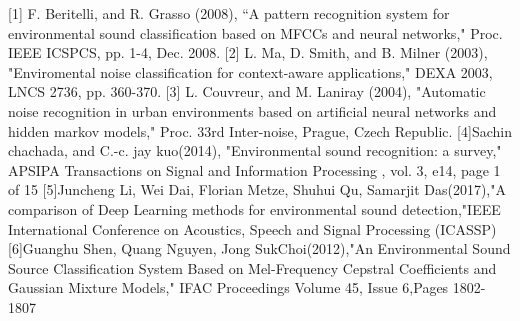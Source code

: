 [1] F. Beritelli, and R. Grasso (2008), “A pattern recognition system for environmental sound classification based on MFCCs and neural networks," Proc. IEEE ICSPCS, pp.
1-4, Dec. 2008.
[2] L. Ma, D. Smith, and B. Milner (2003), "Enviromental
noise classification for context-aware applications,"
DEXA 2003, LNCS 2736, pp. 360-370.
[3] L. Couvreur, and M. Laniray (2004), "Automatic noise
recognition in urban environments based on artificial
neural networks and hidden markov models," Proc. 33rd
Inter-noise, Prague, Czech Republic.
[4]Sachin chachada, and C.-c. jay kuo(2014), "Environmental sound recognition: a survey," APSIPA Transactions on Signal and Information Processing , vol. 3, e14, page 1 of 15
[5]Juncheng Li, Wei Dai, Florian Metze, Shuhui Qu, Samarjit Das(2017),"A comparison of Deep Learning methods for environmental sound detection,"IEEE International Conference on Acoustics, Speech and Signal Processing (ICASSP)
[6]Guanghu Shen, Quang Nguyen, Jong SukChoi(2012),"An Environmental Sound Source Classification System Based on Mel-Frequency Cepstral Coefficients and Gaussian Mixture Models," IFAC Proceedings Volume 45, Issue 6,Pages 1802-1807
